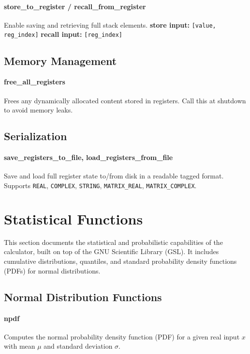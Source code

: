 \documentclass[12pt]{article}
\begin{document}
\paragraph{store\_to\_register / recall\_from\_register}
Enable saving and retrieving full stack elements.  
\textbf{store input:} \texttt{[value, reg\_index]}  
\textbf{recall input:} \texttt{[reg\_index]}

\subsection{Memory Management}

\paragraph{free\_all\_registers}
Frees any dynamically allocated content stored in registers.  
Call this at shutdown to avoid memory leaks.

\subsection{Serialization}

\paragraph{save\_registers\_to\_file, load\_registers\_from\_file}
Save and load full register state to/from disk in a readable tagged format.  
Supports \texttt{REAL}, \texttt{COMPLEX}, \texttt{STRING}, \texttt{MATRIX\_REAL}, \texttt{MATRIX\_COMPLEX}.


\section{Statistical Functions}

This section documents the statistical and probabilistic capabilities of the calculator, built on top of the GNU Scientific Library (GSL). It includes cumulative distributions, quantiles, and standard probability density functions (PDFs) for normal distributions.

\subsection{Normal Distribution Functions}

\paragraph{npdf}
Computes the normal probability density function (PDF) for a given real input \( x \) with mean \( \mu \) and standard deviation \( \sigma \).
\end{document}

